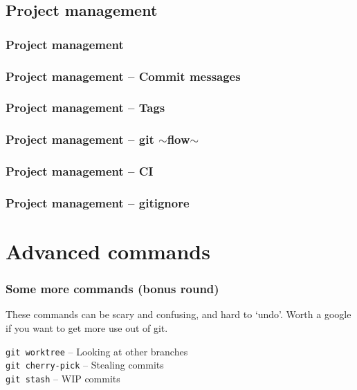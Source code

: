 \documentclass{beamer}
\begin{document}
\subsection{Project management}

\begin{frame}[fragile]
  \frametitle{Project management}
\end{frame}

\begin{frame}[fragile]
  \frametitle{Project management -- Commit messages}
\end{frame}

\begin{frame}[fragile]
  \frametitle{Project management -- Tags}
\end{frame}

\begin{frame}[fragile]
  \frametitle{Project management -- git $\sim$flow$\sim$}
\end{frame}

\begin{frame}[fragile]
  \frametitle{Project management -- CI} %
\end{frame}

\begin{frame}[fragile]
  \frametitle{Project management -- gitignore}
\end{frame}

\section{Advanced commands}

\begin{frame}[fragile]
  \frametitle{Some more commands (bonus round)}
  These commands can be scary and confusing, and hard to `undo'. Worth a google if you
  want to get more use out of git.
  \vspace{1em}
  
  \texttt{git worktree} -- Looking at other branches \\
  \texttt{git cherry-pick} -- Stealing commits \\
  \texttt{git stash} -- WIP commits \\
    
\end{frame}
\end{document}
